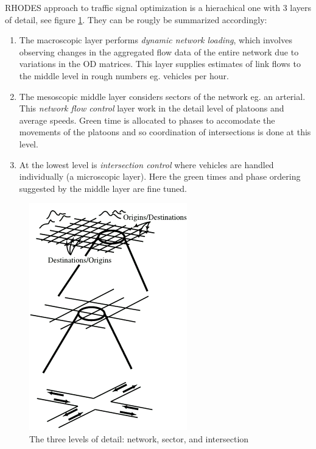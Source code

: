 RHODES approach to traffic signal optimization is a hierachical one with 3 layers of detail, see figure \ref{fig:rhodes_hierarchi}. They can be rougly be summarized accordingly:

\begin{enumerate}
\item The macroscopic layer performs \textit{dynamic network loading}, which involves observing changes in the aggregated flow data of the entire network due to variations in the OD matrices. This layer supplies estimates of link flows to the middle level in rough numbers eg. vehicles per hour.
\item The mesoscopic middle layer considers sectors of the network eg. an arterial. This \textit{network flow control} layer work in the detail level of platoons and average speeds. Green time is allocated to phases to accomodate the movements of the platoons and so coordination of intersections is done at this level.
\item At the lowest level is \textit{intersection control} where vehicles are handled individually (a microscopic layer). Here the green times and phase ordering suggested by the middle layer are fine tuned.
\end{enumerate}

\begin{figure}[!ht]
\begin{center}
\includegraphics[scale=0.5]{rhodes_hierachy.png} 
\end{center}
\caption{The three levels of detail: network, sector, and intersection}
\label{fig:rhodes_hierarchi}
\end{figure}

